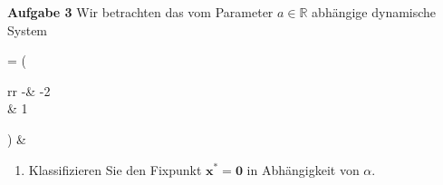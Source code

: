 \documentclass[
	final,
	oneside,
	parskip=full,
	headings=standardclasses,
	headings=big,
	pointednumbers
]{scrartcl}
\begin{document}
	\begin{minipage}{0.5\linewidth}
		\textbf{Aufgabe 3} \; Wir betrachten das vom Parameter $a \in \mathbb{R}$
		abhängige dynamische System
		\vspace{-0.25cm}
		\begin{flalign*}
			 = \left(
			\arraycolsep=3pt\def\arraystretch{1}
			\begin{array}{rr}
			-\alpha & -2 \\
			\alpha  & 1
			\end{array}
			\right)  &
		\end{flalign*}
		\vspace{-0.75cm}
		\renewcommand{\labelenumi}{\alph{enumi})}
		\begin{enumerate}[leftmargin=0.5cm]
			\item
				Klassifizieren Sie den Fixpunkt $ \boldsymbol{x^*} = \boldsymbol{0} $
				in Abhängigkeit von $\alpha$.
		\end{enumerate}
	\end{minipage}
\end{document}

